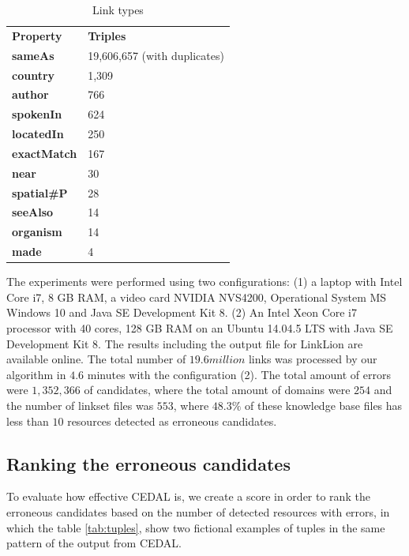 \begin{table}[H]
	\centering
	\caption{Link types}
	\label{tab:linkTypes}
	\begin{tabular}{ll}
		\hline\noalign{\smallskip}
		\textbf{Property}   & \textbf{Triples}  \\
		\noalign{\smallskip}
		\hline
		\textbf{sameAs}     & 19,606,657 (with duplicates)    \\
		\textbf{country}    & 1,309                 \\
		\textbf{author}     & 766              \\
		\textbf{spokenIn}   & 624                  \\
		\textbf{locatedIn}  & 250                  \\
		\textbf{exactMatch} & 167                 \\
		\textbf{near}       & 30                   \\
		\textbf{spatial\#P} & 28                   \\
		\textbf{seeAlso}    & 14             \\
		\textbf{organism}   & 14      \\
		\textbf{made}       & 4                \\
		\hline           
	\end{tabular}
\end{table}
%
The experiments were performed using two configurations: (1) a laptop with Intel Core i7, 8 GB RAM, a video card NVIDIA NVS4200, Operational System MS Windows 10 and Java SE Development Kit 8. (2) An Intel Xeon Core i7 processor with 40 cores, 128 GB RAM on an Ubuntu 14.04.5 LTS with Java SE Development Kit 8. The results including the output file for LinkLion are available online.
The total number of $19.6 million$ links was processed by our algorithm in $4.6$ minutes with the configuration (2). The total amount of errors were $1,352,366$ of candidates, where the total amount of domains were $254$ and  the number of linkset files was $553$, where $48.3\%$ of these knowledge base files has less than $10$ resources detected as erroneous candidates. 

\subsection{Ranking the erroneous candidates}
To evaluate how effective CEDAL is, we create a score in order to rank the erroneous candidates based on the number of detected resources with errors, in which the table \ref{tab:tuples}, show two fictional examples of tuples in the same pattern of the output from CEDAL.

